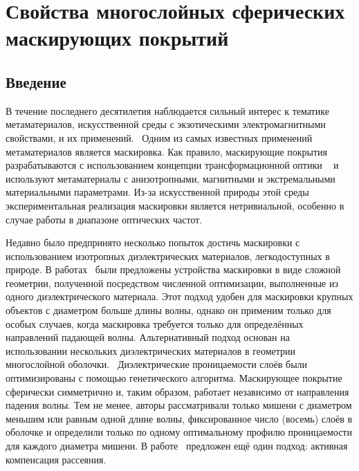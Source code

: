 \chapter{Свойства многослойных сферических маскирующих
  покрытий} \label{chapt3}
\section{Введение}
В течение последнего десятилетия наблюдается сильный интерес к
тематике метаматериалов, искусственной среды с экзотическими
электромагнитными свойствами, и их применений.~\cite{Smith-2004,
  Schurig-2006, Shalaev-2007, Kivshar-2012} Одним из самых известных
применений метаматериалов является маскировка. Как правило,
маскирующие покрытия разрабатываются с использованием концепции
трансформационной оптики ~\cite{pendry_TO, Leonhardt-2006} и
используют метаматериалы с анизотропными, магнитными и экстремальными
материальными параметрами. Из-за искусственной природы этой среды
экспериментальная реализация маскировки является нетривиальной,
особенно в случае работы в диапазоне оптических
частот.~\cite{Kildishev:2011, alu, XU-Su:120408, Alu-2005}

Недавно было предпринято несколько попыток достичь маскировки с
использованием изотропных диэлектрических материалов, легкодоступных в
природе. В работах~\cite{Sigmund-AllDiel-2011,
  smith-3dprinterCloak-2013, Fujii_topolOpti_theory_2013,
  ma-experiment-topology-2013,LayeredShell,MOP:MOP27024} были предложены устройства маскировки в
виде сложной геометрии, полученной посредством численной оптимизации,
выполненные из одного диэлектрического материала.  Этот подход удобен
для маскировки крупных объектов с диаметром больше длины волны, однако
он применим только для особых случаев, когда маскировка требуется
только для определённых направлений падающей волны. Альтернативный
подход основан на использовании нескольких диэлектрических материалов
в геометрии многослойной оболочки.~\cite{semouchkina2,
  Semouchkina-2013} Диэлектрические проницаемости слоёв
были оптимизированы с помощью генетического алгоритма. Маскирующее
покрытие сферически симметрично и, таким образом, работает независимо
от направления падения волны. Тем не менее, авторы рассматривали
только мишени с диаметром меньшим или равным одной длине волны,
фиксированное число (восемь) слоёв в оболочке и определили только по
одному оптимальному профилю проницаемости для каждого диаметра мишени.
В работе~\cite{Elefteriades_ActiveCloak_2013} предложен ещё один
подход: активная компенсация рассеяния.



